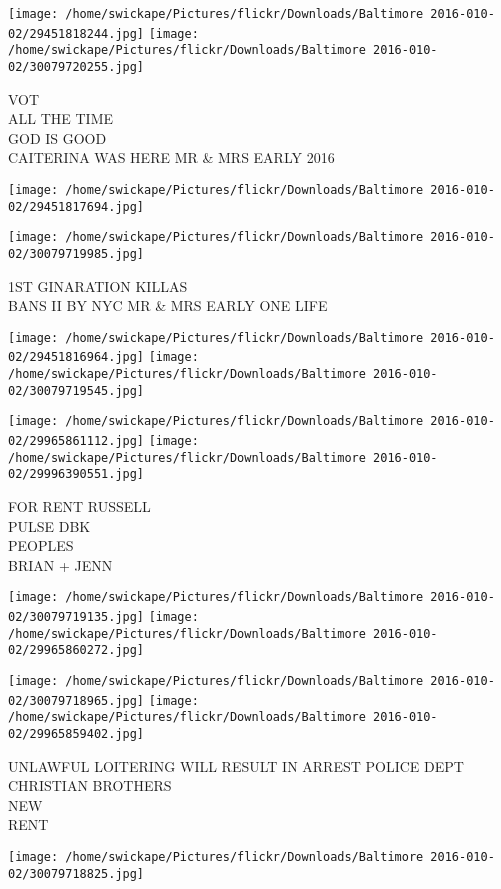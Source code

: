 \documentclass[10pt,letterpaper]{article}
\begin{document}
\texttt{[image: /home/swickape/Pictures/flickr/Downloads/Baltimore 2016-010-02/29451818244.jpg]}
\texttt{[image: /home/swickape/Pictures/flickr/Downloads/Baltimore 2016-010-02/30079720255.jpg]}

VOT\\
ALL THE TIME\\
GOD IS GOOD\\
CAITERINA WAS HERE MR \& MRS EARLY 2016
\pagebreak

\texttt{[image: /home/swickape/Pictures/flickr/Downloads/Baltimore 2016-010-02/29451817694.jpg]}

\vspace{0.25in}
\texttt{[image: /home/swickape/Pictures/flickr/Downloads/Baltimore 2016-010-02/30079719985.jpg]}

1ST GINARATION KILLAS\\
BANS II BY NYC MR \& MRS EARLY ONE LIFE
\pagebreak

\texttt{[image: /home/swickape/Pictures/flickr/Downloads/Baltimore 2016-010-02/29451816964.jpg]}
\texttt{[image: /home/swickape/Pictures/flickr/Downloads/Baltimore 2016-010-02/30079719545.jpg]}

\texttt{[image: /home/swickape/Pictures/flickr/Downloads/Baltimore 2016-010-02/29965861112.jpg]}
\texttt{[image: /home/swickape/Pictures/flickr/Downloads/Baltimore 2016-010-02/29996390551.jpg]}

FOR RENT RUSSELL\\
PULSE DBK\\
PEOPLES\\
BRIAN + JENN
\pagebreak

\texttt{[image: /home/swickape/Pictures/flickr/Downloads/Baltimore 2016-010-02/30079719135.jpg]}
\texttt{[image: /home/swickape/Pictures/flickr/Downloads/Baltimore 2016-010-02/29965860272.jpg]}

\texttt{[image: /home/swickape/Pictures/flickr/Downloads/Baltimore 2016-010-02/30079718965.jpg]}
\texttt{[image: /home/swickape/Pictures/flickr/Downloads/Baltimore 2016-010-02/29965859402.jpg]}

UNLAWFUL LOITERING WILL RESULT IN ARREST POLICE DEPT\\
CHRISTIAN BROTHERS\\
NEW\\
RENT
\pagebreak

\texttt{[image: /home/swickape/Pictures/flickr/Downloads/Baltimore 2016-010-02/30079718825.jpg]}
\end{document}
